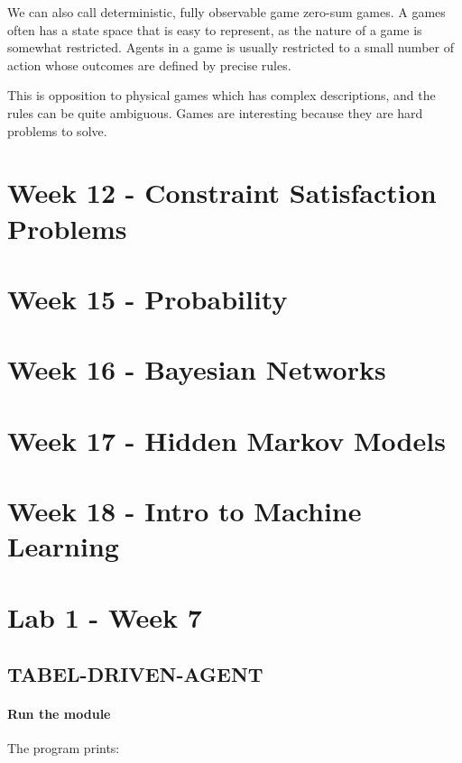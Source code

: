 \documentclass{article}
\begin{document}
We can also call deterministic, fully observable game zero-sum games. A games
often has a state space that is easy to represent, as the nature of a game is
somewhat restricted. Agents in a game is usually restricted to a small number of
action whose outcomes are defined by precise rules.

This is opposition to physical games which has complex descriptions, and the
rules can be quite ambiguous. Games are interesting because they are hard
problems to solve.


\newpage
\section{Week 12 - Constraint Satisfaction Problems}%
\label{sec:23_march_constraint_satisfaction_problems}



\newpage
\section{Week 15 - Probability}%
\label{sec:12_march_probability}

\newpage
\section{Week 16 - Bayesian Networks}%
\label{sec:20_march_bayesian_networks}

\newpage
\section{Week 17 - Hidden Markov Models}%
\label{sec:27_march_hidden_markov_models}

\newpage
\section{Week 18 - Intro to Machine Learning}%
\label{sec:}

\newpage
\section{Lab 1 - Week 7}%
\label{sec:lab_week_7}

\subsection{TABEL-DRIVEN-AGENT}%
\label{sub:tabel_driven_agent}

\paragraph{Run the module}
The program prints:
\end{document}
